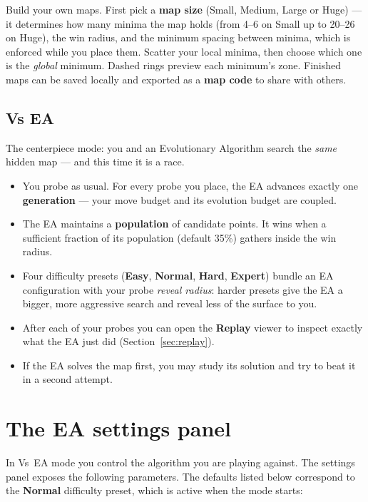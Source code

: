 \documentclass[11pt,a4paper]{report}
\newcommand{\uielem}[1]{\textsf{\textbf{#1}}} %
\begin{document}
Build your own maps. First pick a \textbf{map size} (Small, Medium, Large or
Huge) --- it determines how many minima the map holds (from 4--6 on Small up
to 20--26 on Huge), the win radius, and the minimum spacing between minima,
which is enforced while you place them. Scatter your local minima, then
choose which one is the \emph{global} minimum. Dashed rings preview each
minimum's zone. Finished maps can be saved locally and exported as a
\textbf{map code} to share with others.

\subsection{Vs EA}

The centerpiece mode: you and an Evolutionary Algorithm search the
\emph{same} hidden map --- and this time it is a race.

\begin{itemize}
  \item You probe as usual. For every probe you place, the EA advances
        exactly one \textbf{generation} --- your move budget and its
        evolution budget are coupled.
  \item The EA maintains a \textbf{population} of candidate points. It wins
        when a sufficient fraction of its population (default 35\%)
        gathers inside the win radius.
  \item Four difficulty presets (\uielem{Easy}, \uielem{Normal},
        \uielem{Hard}, \uielem{Expert}) bundle an EA configuration with
        your probe \emph{reveal radius}: harder presets give the EA a
        bigger, more aggressive search and reveal less of the surface to
        you.
  \item After each of your probes you can open the \uielem{Replay} viewer
        to inspect exactly what the EA just did
        (Section~\ref{sec:replay}).
  \item If the EA solves the map first, you may study its solution and try
        to beat it in a second attempt.
\end{itemize}

\section{The EA settings panel}
\label{sec:ea-settings}

In Vs~EA mode you control the algorithm you are playing against. The
settings panel exposes the following parameters. The defaults listed below
correspond to the \uielem{Normal} difficulty preset, which is active when
the mode starts:
\end{document}
